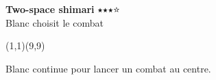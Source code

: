 \documentclass[preview, border=0pt, varwidth=false]{standalone}
\begin{document}
	\setgounit{0.6cm} 
	
	\parbox[c][14.65cm][c]{10.2cm}{
		\centering
		
		{\Large\textbf{Two-space shimari} $\medblackstar \medblackstar \medblackstar \medwhitestar$\\ Blanc choisit le combat}
		\vspace{3em}
		
		\begin{psgopartialboard}{(1,1)(9,9)}
			\pass
		\end{psgopartialboard}
		
		\vspace{1em}
		Blanc continue pour lancer un combat au centre.
	}
	
\end{document}
